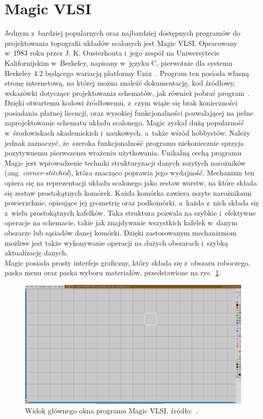\section{Magic VLSI}

Jednym z~bardziej popularnych oraz najbardziej dostępnych programów do projektowania topografii układów scalonych
jest Magic VLSI\@.
Opracowany w~1983 roku przez J. K. Ousterhouta i~jego zespół na Uniwersytecie Kalifornijskim w~Berkeley,
napisany w~języku C, pierwotnie dla systemu Berkeley 4.2 będącego wariacją platformy Unix~\cite{MAGIC_article}.
Program ten posiada własną stronę internetową, na której można znaleźć dokumentację, kod źródłowy,
wskazówki dotyczące projektowania schematów, jak również pobrać program~\cite{MAGIC_site}.
Dzięki otwartemu kodowi źródłowemu, z~czym wiąże się brak konieczności posiadania płatnej licencji,
oraz wysokiej funkcjonalności pozwalającej na pełne zaprojektowanie schematu układu scalonego,
Magic zyskał dużą popularność
w~środowiskach akademickich i~naukowych, a~także wśród hobbystów.
Należy jednak zaznaczyć, że~szeroka funkcjonalność programu
niekoniecznie sprzyja pozytywnemu pierwszemu wrażeniu użytkowania. %
\newpage
\indent Unikalną cechą programu Magic jest wprowadzenie techniki strukturyzacji danych
zszytych narożników (ang. \textit{corner-stitched}),
która znacząco poprawia jego wydajność.
Mechanizm ten opiera się na reprezentacji układu scalonego jako zestaw warstw,
na które składa się zestaw prostokątnych komórek.
Każda komórka zawiera zszyte narożnikami powierzchnie,
opisujące jej geometrię oraz podkomórki, a~każda z~nich składa się z~wielu prostokątnych kafelków.
Taka struktura pozwala na szybkie i~efektywne operacje na schemacie,
takie jak znajdywanie wszystkich kafelek w~danym obszarze lub sąsiadów danej komórki.
Dzięki zastosowanym mechanizmom możliwe jest także wykonywanie operacji na dużych obszarach
i~szybką aktualizację danych.\\
\indent Magic posiada prosty interfejs graficzny,
który składa się z~obszaru roboczego, paska menu oraz paska wyboru materiałów,
przedstawione na rys.~\ref{fig:magic_okno}.

\begin{figure}[h]
    \centering
    \includegraphics[width=.9\textwidth]{chapters/chapter2/img/magic_okno}
    \caption[Widok głównego okna programu Magic VLSI.]{Widok głównego okna programu Magic VLSI, źródło:~\cite{MAGIC_site}.}
    \label{fig:magic_okno}
\end{figure}

